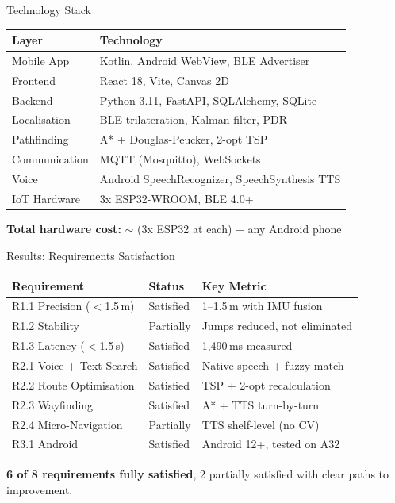\documentclass[aspectratio=169,12pt]{beamer}
\begin{document}
\begin{frame}{Technology Stack}
\begin{table}
\centering
\small
\begin{tabular}{@{}ll@{}}
\toprule
\textbf{Layer} & \textbf{Technology} \\
\midrule
Mobile App      & Kotlin, Android WebView, BLE Advertiser \\
Frontend        & React 18, Vite, Canvas 2D \\
Backend         & Python 3.11, FastAPI, SQLAlchemy, SQLite \\
Localisation    & BLE trilateration, Kalman filter, PDR \\
Pathfinding     & A* + Douglas-Peucker, 2-opt TSP \\
Communication   & MQTT (Mosquitto), WebSockets \\
Voice           & Android SpeechRecognizer, SpeechSynthesis TTS \\
IoT Hardware    & 3x ESP32-WROOM, BLE 4.0+ \\
\bottomrule
\end{tabular}
\end{table}
\vspace{0.5em}
\begin{center}
\textbf{Total hardware cost:} $\sim$ (3x ESP32 at  each) + any Android phone
\end{center}
\end{frame}

\begin{frame}{Results: Requirements Satisfaction}
\begin{table}
\centering
\small
\begin{tabular}{@{}lll@{}}
\toprule
\textbf{Requirement} & \textbf{Status} & \textbf{Key Metric} \\
\midrule
R1.1 Precision ($<$1.5\,m)  & Satisfied & 1--1.5\,m with IMU fusion \\
R1.2 Stability              & Partially & Jumps reduced, not eliminated \\
R1.3 Latency ($<$1.5\,s)    & Satisfied & 1,490\,ms measured \\
R2.1 Voice + Text Search    & Satisfied & Native speech + fuzzy match \\
R2.2 Route Optimisation     & Satisfied & TSP + 2-opt recalculation \\
R2.3 Wayfinding             & Satisfied & A* + TTS turn-by-turn \\
R2.4 Micro-Navigation       & Partially & TTS shelf-level (no CV) \\
R3.1 Android                & Satisfied & Android 12+, tested on A32 \\
\bottomrule
\end{tabular}
\end{table}
\vspace{0.5em}
\textbf{6 of 8 requirements fully satisfied}, 2 partially satisfied with clear paths to improvement.
\end{frame}
\end{document}
